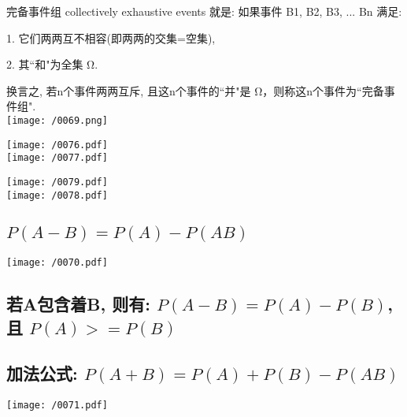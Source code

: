 \documentclass[UTF8]{ctexart}
\begin{document}
	完备事件组 collectively exhaustive events 就是: 如果事件 B1, B2, B3, ...  Bn 满足:
	
	1. 它们两两互不相容(即两两的交集=空集),
	
	2. 其``和"为全集 Ω. 	
	
	换言之, 若n个事件两两互斥, 且这n个事件的``并"是 Ω，则称这n个事件为``完备事件组". \\
	
	\texttt{[image: /0069.png]}
	
	
	\begin{myEnvSample}
\texttt{[image: /0076.pdf]} \\

\texttt{[image: /0077.pdf]}
	\end{myEnvSample}
	
	
	\begin{myEnvSample}
	\texttt{[image: /0079.pdf]} \\
		
\texttt{[image: /0078.pdf]} 
	\end{myEnvSample}
	
	
	
	\subsection{$P(A-B) = P(A) - P(AB)$}	
		\texttt{[image: /0070.pdf]}
		
	
	\subsection{若A包含着B, 则有: $ P(A-B) = P(A) - P(B)$, 且 $P(A) >= P(B) $}
	
	
	\subsection{加法公式: $ P(A+B) = P(A) + P(B) - P(AB)$}	
	\texttt{[image: /0071.pdf]} \\
	
\end{document}
